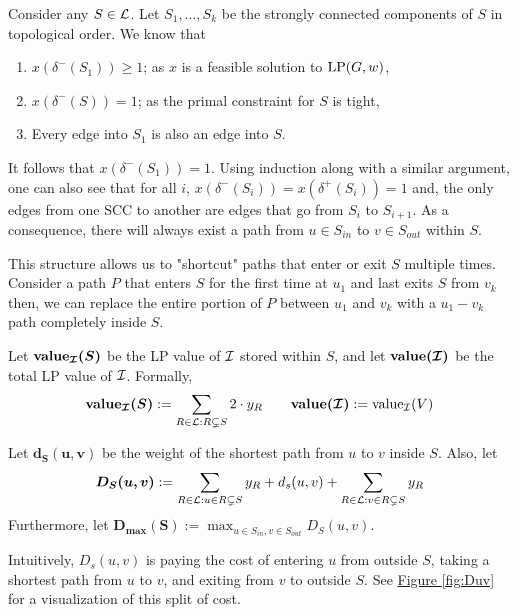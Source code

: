 
	Consider any $S\in \mathcal{L}$. Let $S_1,\dots, S_k$ be the strongly connected components of $S$ in topological order. 
	We know that
	\begin{enumerate}
		\item $x(\delta^-(S_1)) \geq 1$; as $x$ is a feasible solution to $\textup{LP}(G,w)$,
		\item $x(\delta^-(S)) = 1$; as the primal constraint for $S$ is tight,
		\item Every edge into $S_1$ is also an edge into $S$.
	\end{enumerate}
	It follows that $x(\delta^-(S_1)) = 1$. 
	Using induction along with a similar argument, one can also see that for all $i$, $x(\delta^-(S_i)) = x(\delta^+(S_i)) = 1$ and, the only edges from one SCC to another are edges that go from $S_i$ to $S_{i + 1}$. 
	As a consequence, there will always exist a path from $u\in S_{in}$ to $v\in S_{out}$ within $S$.
	
	This structure allows us to "shortcut" paths that enter or exit $S$ multiple times. Consider a path $P$ that enters $S$ for the first time at $u_1$ and last exits $S$ from $v_k$ then, we can replace the entire portion of $P$ between $u_1$ and $v_k$ with a $u_1 - v_k$ path completely inside $S$.\\
	
	\begin{definition}\label{def:value}
		Let $\bm{\textbf{\textup{value}}_{\mathcal{I}}(S)}$ be the LP value of $\mathcal{I}$ stored within $S$, and let $\bm{\textbf{\textup{value}}(\mathcal{I})}$ be the total LP value of $\mathcal{I}$. Formally, 
		\[
			\bm{\textbf{\textup{value}}_{\mathcal{I}}(S)}:=\sum\limits_{R\in \mathcal{L}:R\subsetneq S}2\cdot y_R\qquad \bm{\textbf{\textup{value}}(\mathcal{I})}:=\textup{value}_{\mathcal{I}}(V)
		\]
	\end{definition}
	
	\begin{definition} 
		Let $\bm{d_S(u,v)}$ be the weight of the shortest path from $u$ to $v$ inside $S$. Also, let 
		\begin{equation}
			\bm{D_S(u,v)}:=\sum_{R\in \mathcal{L} : u\in R\subsetneq S}y_R + d_s(u,v) + \sum_{R\in \mathcal{L} : v\in R\subsetneq S}y_R\label{def:1}
		\end{equation}
		Furthermore, let $\bm{D_{\max}(S)} := \max_{u \in S_{in}, v \in S_{out}}D_S(u,v)$.
		
		Intuitively, $D_s(u,v)$ is paying the cost of entering $u$ from outside $S$, taking a shortest path from $u$ to $v$, and exiting from $v$ to outside $S$. See \hyperref[fig:Duv]{Figure \ref{fig:Duv}} for a visualization of this split of cost.\\
	\end{definition}
	
	
